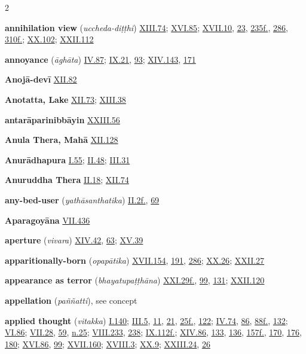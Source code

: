 \begin{multicols}{2}
\begin{vismHanging}
\par\textbf{annihilation view} (\emph{uccheda-diṭṭhi}) \hyperlink{XIII.74}{XIII.74}{}; \hyperlink{XVI.85}{XVI.85}{}; \hyperlink{XVII.10}{XVII.10}{}, \hyperlink{XVII.23}{23}{}, \hyperlink{XVII.235}{235f.}{}, \hyperlink{XVII.286}{286}{}, \hyperlink{XVII.310}{310f.}{}; \hyperlink{XX.102}{XX.102}{}; \hyperlink{XXII.112}{XXII.112}{}
\par\textbf{annoyance} (\emph{āghāta}) \hyperlink{IV.87}{IV.87}{}; \hyperlink{IX.21}{IX.21}{}, \hyperlink{IX.93}{93}{}; \hyperlink{XIV.143}{XIV.143}{}, \hyperlink{XIV.171}{171}{}
\par\textbf{Anojā-devī} \hyperlink{XII.82}{XII.82}{}
\par\textbf{Anotatta, Lake} \hyperlink{XII.73}{XII.73}{}; \hyperlink{XIII.38}{XIII.38}{}
\par\textbf{antarāparinibbāyin} \hyperlink{XXIII.56}{XXIII.56}{}
\par\textbf{Anula Thera, Mahā} \hyperlink{XII.128}{XII.128}{}
\par\textbf{Anurādhapura} \hyperlink{I.55}{I.55}{}; \hyperlink{II.48}{II.48}{}; \hyperlink{III.31}{III.31}{}
\par\textbf{Anuruddha Thera} \hyperlink{II.18}{II.18}{}; \hyperlink{XII.74}{XII.74}{}
\par\textbf{any-bed-user} (\emph{yathāsanthatika}) \hyperlink{II.2}{II.2f.}{}, \hyperlink{II.69}{69}{}
\par\textbf{Aparagoyāna} \hyperlink{VII.436}{VII.436}{}
\par\textbf{aperture} (\emph{vivara}) \hyperlink{XIV.42}{XIV.42}{}, \hyperlink{XIV.63}{63}{}; \hyperlink{XV.39}{XV.39}{}
\par\textbf{apparitionally-born} (\emph{opapātika}) \hyperlink{XVII.154}{XVII.154}{}, \hyperlink{XVII.191}{191}{}, \hyperlink{XVII.286}{286}{}; \hyperlink{XX.26}{XX.26}{}; \hyperlink{XXII.27}{XXII.27}{}
\par\textbf{appearance as terror} (\emph{bhayatupaṭṭhāna}) \hyperlink{XXI.29}{XXI.29f.}{}, \hyperlink{XXI.99}{99}{}, \hyperlink{XXI.131}{131}{}; \hyperlink{XXII.120}{XXII.120}{}
\par\textbf{appellation} (\emph{paññatti}), see concept
\par\textbf{applied thought} (\emph{vitakka}) \hyperlink{I.140}{I.140}{}; \hyperlink{III.5}{III.5}{}, \hyperlink{III.11}{11}{}, \hyperlink{III.21}{21}{}, \hyperlink{III.25}{25f.}{}, \hyperlink{III.122}{122}{}; \hyperlink{IV.74}{IV.74}{}, \hyperlink{IV.86}{86}{}, \hyperlink{IV.88}{88f.}{}, \hyperlink{IV.132}{132}{}; \hyperlink{VI.86}{VI.86}{}; \hyperlink{VII.28}{VII.28}{}, \hyperlink{VII.59}{59}{}, \hyperlink{VII.n25}{n.25}{}; \hyperlink{VIII.233}{VIII.233}{}, \hyperlink{VIII.238}{238}{}; \hyperlink{IX.112}{IX.112f.}{}; \hyperlink{XIV.86}{XIV.86}{}, \hyperlink{XIV.133}{133}{}, \hyperlink{XIV.136}{136}{}, \hyperlink{XIV.157}{157f.}{}, \hyperlink{XIV.170}{170}{}, \hyperlink{XIV.176}{176}{}, \hyperlink{XIV.180}{180}{}; \hyperlink{XVI.86}{XVI.86}{}, \hyperlink{XVI.99}{99}{}; \hyperlink{XVII.160}{XVII.160}{}; \hyperlink{XVIII.3}{XVIII.3}{}; \hyperlink{XX.9}{XX.9}{}; \hyperlink{XXIII.24}{XXIII.24}{}, \hyperlink{XXIII.26}{26}{}

\end{vismHanging}
\end{multicols}
